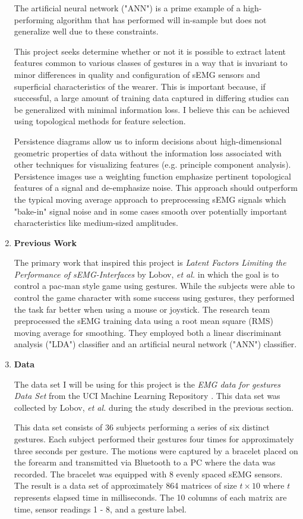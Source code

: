 \documentclass[11pt]{article}
\begin{document}
\begin{enumerate}
The artificial neural network ("ANN") is a prime example of a high-performing algorithm that has performed will in-sample but does not generalize well due to these constraints.

This project seeks determine whether or not it is possible to extract latent features common to various classes of gestures in a way that is invariant to minor differences in quality and configuration of sEMG sensors and superficial characteristics of the wearer. This is important because, if successful, a large amount of training data captured in differing studies can be generalized with minimal information loss. I believe this can be achieved using topological methods for feature selection.

Persistence diagrams allow us to inform decisions about high-dimensional geometric properties of data without the information loss associated with other techniques for visualizing features (e.g. principle component analysis). Persistence images use a weighting function emphasize pertinent topological features of a signal and de-emphasize noise. This approach should outperform the typical moving average approach \cite{state} to preprocessing sEMG signals which "bake-in" signal noise and in some cases smooth over potentially important characteristics like medium-sized amplitudes.


\item \textbf{Previous Work}

The primary work that inspired this project is  \emph{Latent Factors Limiting the Performance of sEMG-Interfaces} by Lobov, \emph{et al.} \cite{lobov} in which the goal is to control a pac-man style game using gestures. While the subjects were able to control the game character with some success using gestures, they performed the task far better when using a mouse or joystick. The research team preprocessed the sEMG training data using a root mean square (RMS) moving average for smoothing. They employed both a linear discriminant analysis ("LDA") classifier and an artificial neural network ("ANN") classifier.

\item \textbf{Data}

The data set I will be using for this project is the \emph{EMG data for gestures Data Set} from the UCI Machine Learning Repository \cite{uci}. This data set was collected by Lobov, \emph{et al.} during the study described in the previous section.

This data set consists of 36 subjects performing a series of six distinct gestures. Each subject performed their gestures four times for approximately three seconds per gesture. The motions were captured by a bracelet placed on the forearm and transmitted via Bluetooth to a PC where the data was recorded. The bracelet was equipped with 8 evenly spaced sEMG sensors. The result is a data set of approximately 864 matrices of size $t \times 10$ where $t$ represents elapsed time in milliseconds. The 10 columns of each matrix are time, sensor readings 1 - 8, and a gesture label.


\end{enumerate}
\end{document}
